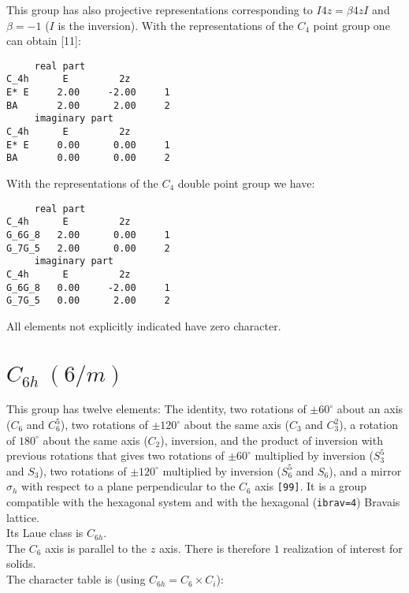 \documentclass[12pt,a4paper,twoside]{report}
\begin{document}
This group has also projective representations corresponding to
$I 4z = \beta 4z I$ and $\beta=-1$ ($I$ is the inversion).
With the representations of the $C_4$ point group one can obtain [11]:

\begin{tcolorbox}
\begin{footnotesize}
\begin{verbatim}
     real part
C_4h      E         2z
E* E     2.00     -2.00     1
BA       2.00      2.00     2
     imaginary part
C_4h      E         2z
E* E     0.00      0.00     1
BA       0.00      0.00     2
\end{verbatim}
\end{footnotesize}
\end{tcolorbox}

With the representations of the $C_4$ double point group we have:

\begin{tcolorbox}
\begin{footnotesize}
\begin{verbatim}
     real part
C_4h      E         2z
G_6G_8   2.00      0.00     1
G_7G_5   2.00      0.00     2
     imaginary part
C_4h      E         2z
G_6G_8   0.00     -2.00     1
G_7G_5   0.00      2.00     2
\end{verbatim}
\end{footnotesize}
\end{tcolorbox}

All elements not explicitly indicated have zero character.

\newpage
{\color{coral}\section{$C_{6h}\ (6/m)$}}  
\color{black}
This group has twelve elements: The identity, two rotations of $\pm60^\circ$ 
about an axis ($C_6$ and $C_6^5$), two rotations of $\pm120^\circ$
about the same axis ($C_3$ and $C_3^2$), a rotation of $180^\circ$ about the
same axis ($C_2$), inversion, and the product of inversion with previous
rotations that gives two rotations of $\pm60^\circ$ multiplied by inversion
($S_3^5$ and $S_3$), two rotations of $\pm120^\circ$ multiplied 
by inversion ($S_6^5$ and $S_6$), and a mirror $\sigma_h$
with respect to a plane perpendicular to the $C_6$ axis \texttt{[99]}. 
It is a group compatible with the hexagonal system and with the  
hexagonal (\texttt{ibrav=4}) Bravais lattice. \\ 
Its Laue class is $C_{6h}$. \\
The $C_6$ axis is parallel to the $z$ axis. There is therefore
$1$ realization of interest for solids. \\
The character table is (using $C_{6h}=C_6 \times C_i$):
\end{document}
